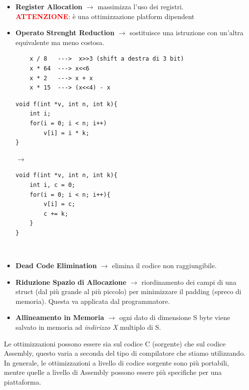 \begin{itemize}
\begin{minipage}{0.5\textwidth}
\begin{verbatim}
    \end{verbatim}
\end{minipage}\medskip\\
\noindent K è un valore arbitrario scelto da noi. Se \textit{n è multiplo di k}
non avremo problemi, se non è multiplo rischiamo di non eseguire alcune operazioni.
    \item \textbf{Register Allocation} $\rightarrow$ massimizza l'uso dei registri.\\
    \textbf{\textcolor{red}{ATTENZIONE}}: è una ottimizzazione platform dipendent
    \item \textbf{Operato Strenght Reduction} $\rightarrow$ sostituisce una istruzione con un'altra 
    equivalente ma meno costosa.
    \begin{verbatim}
    x / 8   --->  x>>3 (shift a destra di 3 bit)
    x * 64  ---> x<<6
    x * 2   ---> x + x
    x * 15  ---> (x<<4) - x
    \end{verbatim}
    \begin{minipage}{0.3\textwidth}
    \begin{verbatim}
void f(int *v, int n, int k){
    int i;
    for(i = 0; i < n; i++)
        v[i] = i * k;
}
    \end{verbatim}
    \end{minipage}
    \hfill
    $\longrightarrow$
    \hfill
    \begin{minipage}{0.3\textwidth}
        \begin{verbatim}
void f(int *v, int n, int k){
    int i, c = 0;
    for(i = 0; i < n; i++){
        v[i] = c;
        c += k;
    }
}
        \end{verbatim}
    \end{minipage}\medskip\\

    \item \textbf{Dead Code Elimination} $\rightarrow$ elimina il codice  non raggiungibile.
    \item \textbf{Riduzione Spazio di Allocazione} $\rightarrow$ riordinamento dei campi di una struct
    (dal più grande al più piccolo) per minimizzare il padding (spreco di memoria). Questa
    va applicata dal programmatore.
    \item \textbf{Allineamento in Memoria} $\rightarrow$ ogni dato di dimensione S byte viene salvato
    in memoria ad \textit{indirizzo X} multiplo di S.
\end{itemize} 
Le ottimizzazioni possono essere sia sul codice C (sorgente) che sul codice Assembly, questo varia a seconda del tipo di
compilatore che stiamo utilizzando. In generale, le ottimizzazioni a livello di codice sorgente sono più portabili, 
mentre quelle a livello di Assembly possono essere più specifiche per una piattaforma.\\
